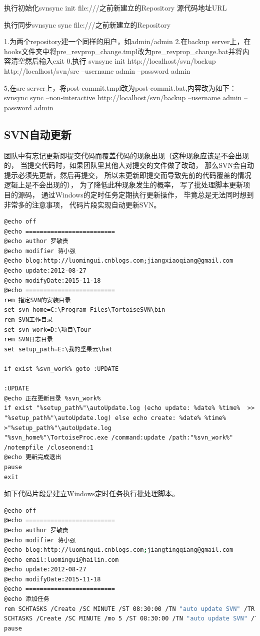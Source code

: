 \documentclass{book}
\newcounter{coderemarks}   %
\newcommand{\circlemark}[1]{%
\tikz\node[text=white,font=\sffamily\bfseries,inner sep=0.2mm,draw,circle,fill=black]{#1};}
\newcommand{\makeremark}[1]{%
\circlemark{\arabic{coderemarks}}%
\global \expandafter\def \csname codebox\the\value{coderemarks}\endcsname{#1}%
\stepcounter{coderemarks}}
\begin{document}
执行初始化svnsync init file:///{之前新建立的Repository}  {源代码地址URL} 

执行同步svnsync sync file:///{之前新建立的Repository}

1.为两个repository建一个同样的用户，如admin/admin
2.在backup server上，在hooks文件夹中将pre\_revprop\_change.tmpl改为pre\_revprop\_change.bat并将内容清空然后输入exit 0,执行
svnsync init http://localhost/svn/backup http://localhost/svn/src --username admin  --password admin

5,在src server上，将post-commit.tmpl改为post-commit.bat,内容改为如下：
svnsync sync --non-interactive http://localhost/svn/backup --username admin  --password admin

\subsection{SVN自动更新}

团队中有忘记更新即提交代码而覆盖代码的现象出现（这种现象应该是不会出现的，
当提交代码时，如果团队里其他人对提交的文件做了改动，
那么SVN会自动提示必须先更新，然后再提交，
所以未更新即提交而导致先前的代码覆盖的情况逻辑上是不会出现的），
为了降低此种现象发生的概率，
写了批处理脚本更新项目的源码，
通过Windows的定时任务定期执行更新操作，
毕竟总是无法同时想到非常多的注意事项，
代码片段实现自动更新SVN。

\begin{lstlisting}[language={[Sharp]C}]
@echo off
@echo =========================
@echo author 罗敏贵
@echo modifier 蒋小强
@echo blog:http://luomingui.cnblogs.com;jiangxiaoqiang@gmail.com
@echo update:2012-08-27
@echo modifyDate:2015-11-18
@echo =========================
rem 指定SVN的安装目录
set svn_home=C:\Program Files\TortoiseSVN\bin 
rem SVN工作目录
set svn_work=D:\项目\Tour
rem SVN日志目录
set setup_path=E:\我的坚果云\bat

if exist %svn_work% goto :UPDATE

:UPDATE
@echo 正在更新目录 %svn_work%
if exist "%setup_path%"\autoUpdate.log (echo update: %date% %time%  >> "%setup_path%"\autoUpdate.log) else echo create: %date% %time% >"%setup_path%"\autoUpdate.log
"%svn_home%"\TortoiseProc.exe /command:update /path:"%svn_work%" /notempfile /closeonend:1
@echo 更新完成退出
pause
exit
\end{lstlisting}

如下代码片段是建立Windows定时任务执行批处理脚本。

\begin{lstlisting}[language=Bash]
@echo off
@echo =========================
@echo author 罗敏贵
@echo modifier 蒋小强
@echo blog:http://luomingui.cnblogs.com;jiangtingqiang@gmail.com
@echo email:luomingui@hailin.com
@echo update:2012-08-27
@echo modifyDate:2015-11-18
@echo =========================
@echo 添加任务
rem SCHTASKS /Create /SC MINUTE /ST 08:30:00 /TN "auto update SVN" /TR  "%~sdp0autosvn.bat" /F
SCHTASKS /Create /SC MINUTE /mo 5 /ST 08:30:00 /TN "auto update SVN" /TR  "%~sdp0autosvn.bat" /F`\makeremark{建立定时任务，任务的名称为“auto update SVN”，名称通过TN参数（Task Name）指定，任务运行指定的autosvn.bat批处理脚本，通过TR参数指定（Task Run），任务每隔5分钟运行一次，即每5分钟更新一次项目代码，时间的长短可根据实际应用环境进行调整}`
pause
\end{lstlisting}
\end{document}

